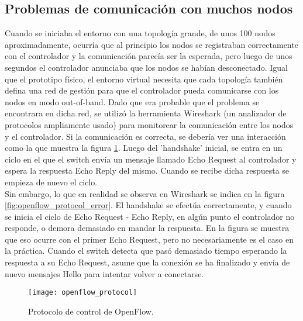 \subsection{Problemas de comunicación con muchos nodos}
Cuando se iniciaba el entorno con una topología grande, de unos 100 nodos aproximadamente, ocurría que al principio los nodos se registraban correctamente con el controlador y la comunicación parecía ser la esperada, pero luego de unos segundos el controlador anunciaba que los nodos se habían desconectado.
Igual que el prototipo físico, el entorno virtual necesita que cada topología también defina una red de gestión para que el controlador pueda comunicarse con los nodos en modo out-of-band. Dado que era probable que el problema se encontrara en dicha red, se utilizó la herramienta Wireshark (un analizador de protocolos ampliamente usado) para monitorear la comunicación entre los nodos y el controlador. Si la comunicación es correcta, se debería ver una interacción como la que muestra la figura \ref{fig:openflow_protocol}. Luego del 'handshake' inicial, se entra en un ciclo en el que el switch envía un mensaje llamado Echo Request al controlador y espera la respuesta Echo Reply del mismo. Cuando se recibe dicha respuesta se empieza de nuevo el ciclo. \\
Sin embargo, lo que en realidad se observa en Wireshark se indica en la figura \ref{fig:openflow_protocol_error}. El handshake se efectúa correctamente, y cuando se inicia el ciclo de Echo Request - Echo Reply, en algún punto el controlador no responde, o demora demasiado en mandar la respuesta. En la figura se muestra que eso ocurre con el primer Echo Request, pero no necesariamente es el caso en la práctica. Cuando el switch detecta que pasó demasiado tiempo esperando la respuesta a su Echo Request, asume que la conexión se ha finalizado y envía de nuevo mensajes Hello para intentar volver a conectarse. \\
\begin{figure}[t]
	\caption{Protocolo de control de OpenFlow.}
	\texttt{[image: openflow\_protocol]}
	\centering
	\label{fig:openflow_protocol}
\end{figure}

